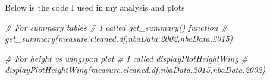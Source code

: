 \documentclass[]{article}
\newenvironment{Shaded}{\begin{snugshade}}{\end{snugshade}}
\newcommand{\CommentTok}[1]{\textcolor[rgb]{0.56,0.35,0.01}{\textit{#1}}}
\begin{document}
Below is the code I used in my analysis and plots

\begin{Shaded}
\begin{Highlighting}[]
\CommentTok{\# For summary tables}
\CommentTok{\# I called get\_summary() function}
\CommentTok{\# get\_summary(measure.cleaned.df,nbaData.2002,nbaData.2015)}

\CommentTok{\# For height vs wingspan plot}
\CommentTok{\# I called displayPlotHeightWing}
\CommentTok{\# displayPlotHeightWing(measure.cleaned.df,nbaData.2015,nbaData.2002)}
\end{Highlighting}
\end{Shaded}







\newpage
\theendnotes

\newpage
\begin{auxmulticols}{2}
\singlespacing 


\end{auxmulticols}

\newpage
{
\hypersetup{linkcolor=black}
\setcounter{tocdepth}{3}
\tableofcontents
}
\end{document}
